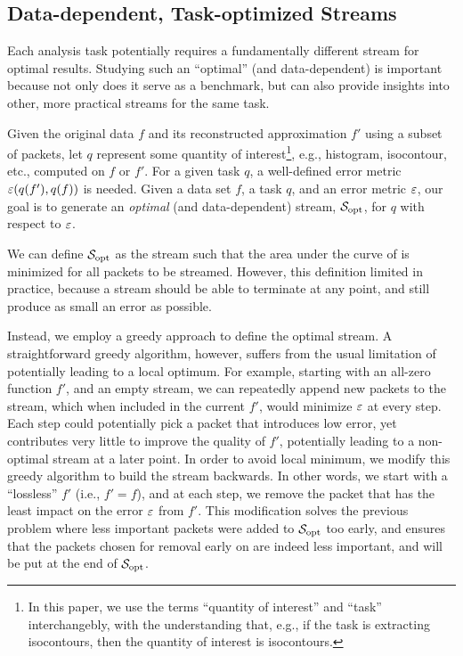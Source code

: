 \subsection{Data-dependent, Task-optimized Streams} \label{sec:data_dep_streams}


Each analysis task potentially requires a fundamentally different stream for
optimal results.  Studying such an ``optimal'' (and data-dependent) is
important because not only does it serve as a benchmark, but can also provide
insights into other, more practical streams for the same task.

Given the original data $f$ and its reconstructed approximation $f'$ using a
subset of packets, let $q$ represent some quantity of interest\footnote{In this
paper, we use the terms ``quantity of interest'' and ``task'' interchangebly,
with the understanding that, e.g., if the task is extracting isocontours, then
the quantity of interest is isocontours.}, e.g., histogram, isocontour, etc.,
computed on $f$ or $f'$. For a given task $q$, a well-defined error metric
$\err(q(f'),q(f))$ is needed. Given a data set $f$, a task $q$, and an error
metric $\err$, our goal is to generate an \emph{optimal} (and data-dependent)
stream, $\sopt$, for $q$ with respect to $\err$.

We can define $\sopt$ as the stream such that the area under the curve of \err
is minimized for all packets to be streamed. However, this definition limited
in practice, because a stream should be able to terminate at any point, and 
still produce as small an error as possible. 

Instead, we employ a greedy approach to define the optimal stream.  A
straightforward greedy algorithm, however, suffers from the usual limitation of
potentially leading to a local optimum. For example, starting with an all-zero
function $f'$, and an empty stream, we can repeatedly append new packets to the
stream, which when included in the current $f'$, would minimize $\err$ at every
step. Each step could potentially pick a packet that introduces low error, yet
contributes very little to improve the quality of $f'$, potentially leading to
a non-optimal stream at a later point.  In order to avoid local minimum, we
modify this greedy algorithm to build the stream backwards. In other words, we
start with a ``lossless'' $f'$ (i.e., $f'=f$), and at each step, we remove the
packet that has the least impact on the error $\err$ from $f'$.  This
modification solves the previous problem where less important packets were
added to $\sopt$ too early, and ensures that the packets chosen for removal
early on are indeed less important, and will be put at the end of $\sopt$.

